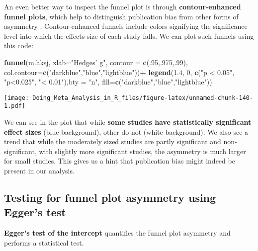 \documentclass[]{book}
\newenvironment{Shaded}{\begin{snugshade}}{\end{snugshade}}
\newcommand{\KeywordTok}[1]{\textcolor[rgb]{0.13,0.29,0.53}{\textbf{#1}}}
\newcommand{\DataTypeTok}[1]{\textcolor[rgb]{0.13,0.29,0.53}{#1}}
\newcommand{\DecValTok}[1]{\textcolor[rgb]{0.00,0.00,0.81}{#1}}
\newcommand{\FloatTok}[1]{\textcolor[rgb]{0.00,0.00,0.81}{#1}}
\newcommand{\StringTok}[1]{\textcolor[rgb]{0.31,0.60,0.02}{#1}}
\newcommand{\OperatorTok}[1]{\textcolor[rgb]{0.81,0.36,0.00}{\textbf{#1}}}
\newcommand{\NormalTok}[1]{#1}
\theoremstyle{definition}
\theoremstyle{definition}
\theoremstyle{definition}
\theoremstyle{remark}
\begin{document}
An even better way to inspect the funnel plot is through
\textbf{contour-enhanced funnel plots}, which help to distinguish
publication bias from other forms of asymmetry
\citep{peters2008contour}. Contour-enhanced funnels include colors
signifying the significance level into which the effects size of each
study falls. We can plot such funnels using this code:

\begin{Shaded}
\begin{Highlighting}[]
\KeywordTok{funnel}\NormalTok{(m.hksj, }\DataTypeTok{xlab=}\StringTok{"Hedges' g"}\NormalTok{, }
       \DataTypeTok{contour =} \KeywordTok{c}\NormalTok{(.}\DecValTok{95}\NormalTok{,.}\DecValTok{975}\NormalTok{,.}\DecValTok{99}\NormalTok{),}
       \DataTypeTok{col.contour=}\KeywordTok{c}\NormalTok{(}\StringTok{"darkblue"}\NormalTok{,}\StringTok{"blue"}\NormalTok{,}\StringTok{"lightblue"}\NormalTok{))}\OperatorTok{+}
\KeywordTok{legend}\NormalTok{(}\FloatTok{1.4}\NormalTok{, }\DecValTok{0}\NormalTok{, }\KeywordTok{c}\NormalTok{(}\StringTok{"p < 0.05"}\NormalTok{, }\StringTok{"p<0.025"}\NormalTok{, }\StringTok{"< 0.01"}\NormalTok{),}\DataTypeTok{bty =} \StringTok{"n"}\NormalTok{,}
       \DataTypeTok{fill=}\KeywordTok{c}\NormalTok{(}\StringTok{"darkblue"}\NormalTok{,}\StringTok{"blue"}\NormalTok{,}\StringTok{"lightblue"}\NormalTok{))}
\end{Highlighting}
\end{Shaded}

\texttt{[image: Doing\_Meta\_Analysis\_in\_R\_files/figure-latex/unnamed-chunk-140-1.pdf]}

We can see in the plot that while \textbf{some studies have
statistically significant effect sizes} (blue background), other do not
(white background). We also see a trend that while the moderately sized
studies are partly significant and non-significant, with slightly more
significant studies, the asymmetry is much larger for small studies.
This gives us a hint that publication bias might indeed be present in
our analysis.

\subsection{Testing for funnel plot asymmetry using Egger's
test}\label{testing-for-funnel-plot-asymmetry-using-eggers-test}

\textbf{Egger's test of the intercept} \citep{egger1997bias} quantifies
the funnel plot asymmetry and performs a statistical test.
\end{document}
